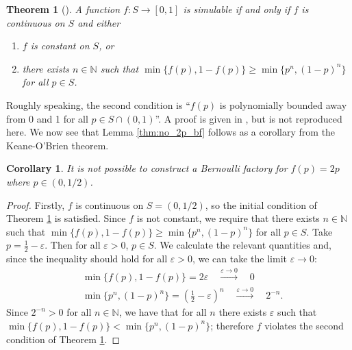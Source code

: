 \documentclass{article}
\newtheorem{thm}{Theorem}
\newtheorem{cor}{Corollary}
\theoremstyle{definition}
\begin{document}
\begin{thm}[\citet{keane1994}]\label{thm:KOB}
A function $f:S\to[0,1]$ is simulable if and only if $f$ is continuous on $S$ and either
\begin{enumerate}[label=(\alph*)]
\item $f$ is constant on $S$, or
\item there exists $n\in\mathbb{N}$ such that $\min\{f(p),1-f(p)\} \geq \min\{p^n, (1-p)^n\}$ for all $p\in S$.
\end{enumerate}
\end{thm}

Roughly speaking, the second condition is ``$f(p)$ is polynomially bounded away from 0 and 1 for all $p\in S\cap(0,1)$''. A proof is given in \citet{keane1994}, but is not reproduced here. We now see that Lemma \ref{thm:no_2p_bf} follows as a corollary from the Keane-O'Brien theorem.
\begin{cor}
It is not possible to construct a Bernoulli factory for $f(p)=2p$ where $p\in(0,1/2)$.
\end{cor}
\begin{proof}
Firstly, $f$ is continuous on $S=(0,1/2)$, so the initial condition of Theorem \ref{thm:KOB} is satisfied.
Since $f$ is not constant, we require that there exists $n\in\mathbb{N}$ such that $\min\{f(p),1-f(p)\} \geq \min\{p^n, (1-p)^n\}$ for all $p\in S$.
Take $p=\frac{1}{2} - \varepsilon$. Then for all $\varepsilon>0$, $p\in S$.
We calculate the relevant quantities and, since the inequality should hold for all $\varepsilon>0$,  we can take the limit $\varepsilon\to 0$:
\begin{align*}
&\min\{f(p),1-f(p)\} = 2\varepsilon \quad \overset{\varepsilon\to 0}{\longrightarrow}\quad 0 \\
&\min\{p^n, (1-p)^n\} = \left( \frac{1}{2} - \varepsilon \right)^n \quad \overset{\varepsilon\to 0}{\longrightarrow}\quad 2^{-n}.
\end{align*}
Since $2^{-n} >0$ for all $n\in\mathbb{N}$, we have that for all $n$ there exists $\varepsilon$ such that $\min\{f(p),1-f(p)\} < \min\{p^n, (1-p)^n\}$; therefore $f$ violates the second condition of Theorem \ref{thm:KOB}.
\end{proof}
\end{document}

